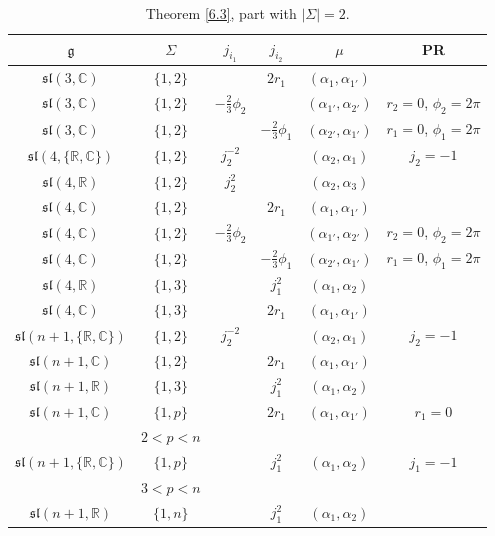\documentclass[pdftex]{sigma}
\newcommand{\Si}{\Sigma}
\newcommand{\fg}{\mathfrak g}
\newcommand{\R}{\mathbb{R}}
\newcommand{\C}{\mathbb{C}}
\numberwithin{equation}{section}
\begin{document}
\begin{table}[th!]\centering \caption{Theorem \ref{6.3}, part with $|\Si|=2$.}\label{ahs2} \vspace{1mm}
\begin{tabular}{|c|c|c|c|c|c|}
\hline
$\fg$ & $\Sigma$ & $j_{i_1}$& $j_{i_2}$& $\mu$&PR \\
\hline
\hline
$\mathfrak{sl}(3,\mathbb{C})$ &$\{1,2\}$&& $2r_1$& $(\alpha_{1},\alpha_{1'})$& \\
\hline
$\mathfrak{sl}(3,\mathbb{C})$& $\{1,2\}$ &$-\frac{2}3\phi_2$& & $ (\alpha_{1'},\alpha_{2'})$& $r_2=0$, $\phi_2=2\pi$ \\
\hline
$\mathfrak{sl}(3,\mathbb{C})$& $\{1,2\}$ && $-\frac23\phi_1$& $ (\alpha_{2'},\alpha_{1'})$& $r_1=0$, $\phi_1=2\pi$ \\
\hline
$\mathfrak{sl}(4,\{\R,\C\})$ & $\{1,2\}$ & $j_2^{-2}$ & & $(\alpha_2,\alpha_1)$& $j_2=-1$ \\
\hline
$\mathfrak{sl}(4,\R)$ & $\{1,2\}$ &$j_2^2$ && $(\alpha_2,\alpha_3)$ & \\
\hline
$\mathfrak{sl}(4,\mathbb{C})$ &$\{1,2\}$&& $2r_1$& $(\alpha_{1},\alpha_{1'})$& \\
\hline
$\mathfrak{sl}(4,\mathbb{C})$& $\{1,2\}$ &$-\frac23\phi_2$& & $ (\alpha_{1'},\alpha_{2'})$& $r_2=0$, $\phi_2=2\pi$ \\
\hline
$\mathfrak{sl}(4,\mathbb{C})$& $\{1,2\}$ && $-\frac23\phi_1$& $ (\alpha_{2'},\alpha_{1'})$& $r_1=0$, $\phi_1=2\pi$ \\
\hline
$\mathfrak{sl}(4,\R)$ & $\{1,3\}$ &&$j_1^2$ &$(\alpha_1,\alpha_2)$& \\
\hline
$\mathfrak{sl}(4,\mathbb{C})$ &$\{1,3\}$&& $2r_1$& $(\alpha_{1},\alpha_{1'})$& \\
\hline
$\mathfrak{sl}(n+1,\{\R,\C\})$ & $\{1,2\}$ & $j_2^{-2}$ & & $(\alpha_2,\alpha_1)$& $j_2=-1$ \\
\hline
$\mathfrak{sl}(n+1,\mathbb{C})$ &$\{1,2\}$&& $2r_1$& $(\alpha_{1},\alpha_{1'})$& \\
\hline
$\mathfrak{sl}(n+1,\R)$ & $\{1,3\}$ &&$j_1^2$ &$(\alpha_1,\alpha_2)$& \\
\hline
$\mathfrak{sl}(n+1,\mathbb{C})$ &$\{1,p\}$&& $2r_1$& $(\alpha_{1},\alpha_{1'})$&$r_1=0$\\
& $2<p<n$& & &&\\
\hline
$\mathfrak{sl}(n+1,\{\R,\C\})$ & $\{1,p\}$ &&$j_1^2$ &$(\alpha_1,\alpha_2)$& $j_1=-1$ \\
& $3<p<n$& & &&\\
\hline
$\mathfrak{sl}(n+1,\R)$ & $\{1,n\}$ &&$j_1^2$ &$(\alpha_1,\alpha_2)$& \\

\end{tabular}
\end{table}
\end{document}
